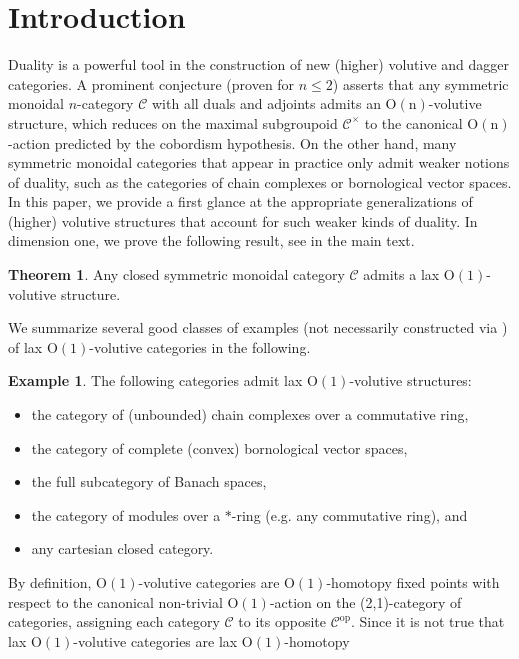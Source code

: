 \documentclass{article}
\newcommand{\opp}{\operatorname{op}}%
\newcommand{\Oone}{\operatorname{O(1)}}
\newcommand{\Onn}{\operatorname{O(n)}}
\newcommand{\C}{\mathcal{C}}
\numberwithin{equation}{section}
\theoremstyle{definition}
\newtheorem{Iexample}{Example}
\theoremstyle{theorem}
\newtheorem{Itheorem}{Theorem}
\begin{document}
\section{Introduction}
Duality is a powerful tool in the construction of new (higher) volutive and dagger categories. A prominent conjecture \cite{ferrer2024daggerncategories} (proven for 
$n \leq 2$) asserts that any symmetric monoidal $n$-category $\C$ with all duals and adjoints admits an $\Onn$-volutive structure, which reduces on the maximal 
subgroupoid $\C^\times$ to the canonical $\Onn$-action predicted by the cobordism hypothesis. On the other hand, many symmetric monoidal categories that appear 
in practice only admit weaker notions of duality, such as the categories of chain complexes or bornological vector spaces. In this paper, we provide a first glance 
at the appropriate generalizations of (higher) volutive structures that account for such weaker kinds of duality. In dimension one, we prove the following result, 
see  in the main text.
\begin{Itheorem}\label{Theorem: csm categories are lax volutive}
    Any closed symmetric monoidal category $\C$ admits a lax $\Oone$-volutive structure.
\end{Itheorem}
We summarize several good classes of examples (not necessarily constructed via ) of lax $\Oone$-volutive 
categories in the following. 
\begin{Iexample}
    The following categories admit lax $\Oone$-volutive structures:
    \begin{itemize}
        \item[(i)] the category of (unbounded) chain complexes over a commutative ring, 
        \item[(ii)] the category of complete (convex) bornological vector spaces, 
        \item[(iii)] the full subcategory of Banach spaces,
        \item[(iv)] the category of modules over a $*$-ring (e.g. any commutative ring), and
        \item[(v)] any cartesian closed category.
    \end{itemize}
\end{Iexample}
By definition, $\Oone$-volutive categories are $\Oone$-homotopy fixed points with respect to the canonical non-trivial $\Oone$-action on the (2,1)-category 
of categories, assigning each category $\C$ to its opposite $\C^{\opp}$. Since it is not true that lax $\Oone$-volutive categories are lax $\Oone$-homotopy 
\end{document}
